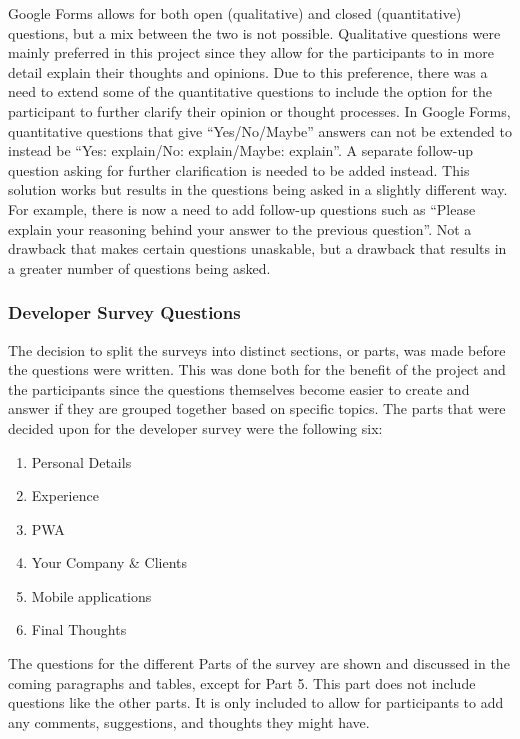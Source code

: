 \documentclass[a4paper,12pt]{article}
\begin{document}
Google Forms allows for both open (qualitative) and closed (quantitative) questions, but a mix between the two is not possible. Qualitative questions were mainly preferred in this project since they allow for the participants to in more detail explain their thoughts and opinions. Due to this preference, there was a need to extend some of the quantitative questions to include the option for the participant to further clarify their opinion or thought processes. In Google Forms, quantitative questions that give “Yes/No/Maybe” answers can not be extended to instead be “Yes: explain/No: explain/Maybe: explain”. A separate follow-up question asking for further clarification is needed to be added instead. This solution works but results in the questions being asked in a slightly different way. For example, there is now a need to add follow-up questions such as “Please explain your reasoning behind your answer to the previous question”. Not a drawback that makes certain questions unaskable, but a drawback that results in a greater number of questions being asked.

\subsubsection{Developer Survey Questions}
\label{Project_surveyDesign_devQuestions}
The decision to split the surveys into distinct sections, or parts, was made before the questions were written. This was done both for the benefit of the project and the participants since the questions themselves become easier to create and answer if they are grouped together based on specific topics. The parts that were decided upon for the developer survey were the following six:

\begin{enumerate}
    \item Personal Details
    \item Experience
    \item PWA
    \item Your Company \& Clients
    \item Mobile applications
    \item Final Thoughts
\end{enumerate}

The questions for the different Parts of the survey are shown and discussed in the coming paragraphs and tables, except for Part 5. This part does not include questions like the other parts. It is only included to allow for participants to add any comments, suggestions, and thoughts they might have.
\end{document}
